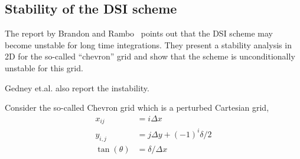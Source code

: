 \documentclass[10pt]{article}
\begin{document}
\subsection{Stability of the DSI scheme}

The report by Brandon and Rambo~\cite{BrandonRambo} points out that the DSI scheme may become
unstable for long time integrations. They present a stability analysis in 2D for the so-called 
``chevron'' grid and show that the scheme is unconditionally unstable for this grid.

Gedney et.al.\cite{GedneyRoden2000} also report the instability.

\newcommand{\dx}{\Delta x}
\newcommand{\dy}{\Delta y}
\newcommand{\Uh}{\hat{U}}
\newcommand{\Vh}{\hat{V}}

Consider the so-called Chevron grid which is a perturbed Cartesian grid,
\begin{align*}
   x_{ij} & = i \dx \\
   y_{i,j}&= j\dy + (-1)^i \delta/2 \\
   \tan(\theta)& =\delta/\dx 
\end{align*}
\end{document}
